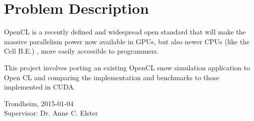 \section*{Problem Description}
OpenCL is a recently defined and widespread open standard that will make the massive parallelism power now available in GPUs, but also newer CPUs (like the Cell B.E.) , more easily accessible to programmers.

This project involves porting an existing OpenCL snow simulation application to Open CL and comparing the implementation and benchmarks to those implemented in CUDA.\\[2cm]

\begin{center}
Trondheim, 2015-01-04\\[1pc]
Supervisor: Dr. Anne C. Elster
\end{center}